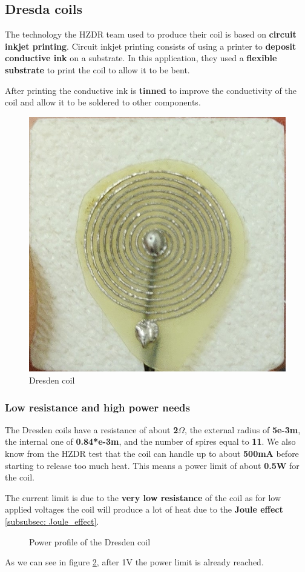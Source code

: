 \subsection{Dresda coils}
The technology the HZDR team used to produce their coil is based on \textbf{circuit inkjet printing}.
Circuit inkjet printing consists of using a printer to \textbf{deposit conductive ink} on a substrate.
In this application, they used a \textbf{flexible substrate} to print the coil to allow it to be bent.

\begin{samepage}
    After printing the conductive ink is \textbf{tinned} to improve the conductivity of the coil and allow it to be soldered to other components.
    \nopagebreak

    \begin{figure}[H]
        \centering
        \includegraphics[width=0.4\linewidth]{Chapters/Chapter5/Coils_alternatives/Figures/Dresden_coil.jpg}
        \caption{Dresden coil \cite{HZDR}}
        \label{fig: Dresden_coil} 
    \end{figure}
\end{samepage}


\subsubsection{Low resistance and high power needs}
The Dresden coils have a resistance of about \textbf{2$\Omega$}, the external radius of \textbf{5e-3m}, the internal one of \textbf{0.84*e-3m}, and the number of spires equal to \textbf{11}.
We also know from the HZDR test that the coil can handle up to about \textbf{500mA} before starting to release too much heat.
This means a power limit of about \textbf{0.5W} for the coil.

\begin{samepage}
    The current limit is due to the \textbf{very low resistance} of the coil as for low applied voltages the coil will produce a lot of heat due to the \textbf{Joule effect} \ref{subsubsec: Joule_effect}.

    \begin{figure}[H]
        \centering
        \resizebox{0.5\textwidth}{!}{}
        \caption{Power profile of the Dresden coil}
        \label{fig: Dresden_heat_graph}
    \end{figure}
    As we can see in figure \ref{fig: Dresden_heat_graph}, after 1V the power limit is already reached.
\end{samepage}


